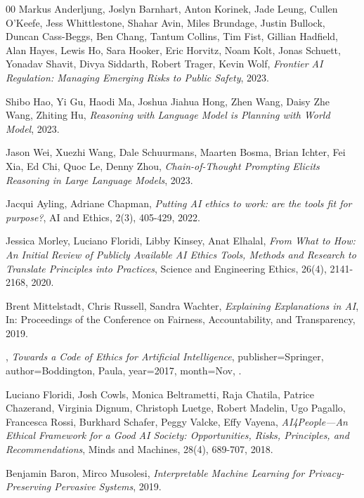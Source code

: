 \documentclass[fleqn,10pt]{wlscirep}
\begin{document}
\begin{thebibliography}{00}
  Markus Anderljung, Joslyn Barnhart, Anton Korinek, Jade Leung, Cullen O'Keefe, Jess Whittlestone, Shahar Avin, Miles Brundage, Justin Bullock, Duncan Cass-Beggs, Ben Chang, Tantum Collins, Tim Fist, Gillian Hadfield, Alan Hayes, Lewis Ho, Sara Hooker, Eric Horvitz, Noam Kolt, Jonas Schuett, Yonadav Shavit, Divya Siddarth, Robert Trager, Kevin Wolf,
  \textit{Frontier AI Regulation: Managing Emerging Risks to Public Safety},
  2023.


  Shibo Hao, Yi Gu, Haodi Ma, Joshua Jiahua Hong, Zhen Wang, Daisy Zhe Wang, Zhiting Hu,
  \textit{Reasoning with Language Model is Planning with World Model},
  2023.


  Jason Wei, Xuezhi Wang, Dale Schuurmans, Maarten Bosma, Brian Ichter, Fei Xia, Ed Chi, Quoc Le, Denny Zhou,
  \textit{Chain-of-Thought Prompting Elicits Reasoning in Large Language Models},
  2023.


  Jacqui Ayling, Adriane Chapman,
  \textit{Putting AI ethics to work: are the tools fit for purpose?},
  AI and Ethics,
  2(3),
  405-429,
  2022.


  Jessica Morley, Luciano Floridi, Libby Kinsey, Anat Elhalal,
  \textit{From What to How: An Initial Review of Publicly Available AI Ethics Tools, Methods and Research to Translate Principles into Practices},
  Science and Engineering Ethics,
  26(4),
  2141-2168,
  2020.


  Brent Mittelstadt, Chris Russell, Sandra Wachter,
  \textit{Explaining Explanations in {AI}},
  In: Proceedings of the Conference on Fairness, Accountability, and Transparency,
  2019.


  ,
  \textit{Towards a Code of Ethics for Artificial Intelligence}, publisher={Springer}, author={Boddington, Paula}, year={2017}, month={Nov},
  .


  Luciano Floridi, Josh Cowls, Monica Beltrametti, Raja Chatila, Patrice Chazerand, Virginia Dignum, Christoph Luetge, Robert Madelin, Ugo Pagallo, Francesca Rossi, Burkhard Schafer, Peggy Valcke, Effy Vayena,
  \textit{AI4People---An Ethical Framework for a Good AI Society: Opportunities, Risks, Principles, and Recommendations},
  Minds and Machines,
  28(4),
  689-707,
  2018.


  Benjamin Baron, Mirco Musolesi,
  \textit{Interpretable Machine Learning for Privacy-Preserving Pervasive Systems},
  2019.



\end{thebibliography}
\end{document}
